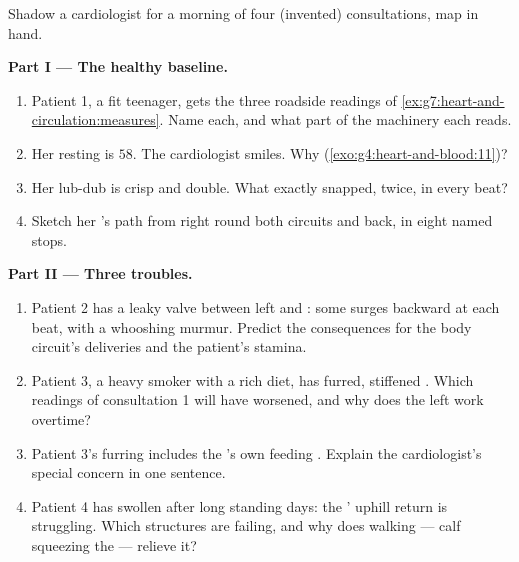 \begin{problem}\label{pb:g7:heart-and-circulation:1}
Shadow a cardiologist for a morning of four (invented)
consultations, map in hand.

\medskip\noindent\textbf{Part I --- The healthy
baseline.}
\begin{enumerate}
  \item Patient 1, a fit teenager, gets the three
        roadside readings of
        \cref{ex:g7:heart-and-circulation:measures}.
        Name each, and what part of the machinery each
        reads.
  \item Her resting  is $58$. The cardiologist
        smiles. Why
        (\cref{exo:g4:heart-and-blood:11})?
  \item Her lub-dub is crisp and double. What exactly
        snapped, twice, in every beat?
  \item Sketch her 's path from right  round
        both circuits and back, in eight named stops.
\end{enumerate}

\medskip\noindent\textbf{Part II --- Three troubles.}
\begin{enumerate}[resume]
  \item Patient 2 has a leaky valve between left 
        and : some  surges backward at
        each beat, with a whooshing murmur. Predict the
        consequences for the body circuit's deliveries
        and the patient's stamina.
  \item Patient 3, a heavy smoker with a rich diet, has
        furred, stiffened . Which readings of
        consultation 1 will have worsened, and why does
        the left  work overtime?
  \item Patient 3's furring includes the 's own
        feeding . Explain the cardiologist's
        special concern in one sentence.
  \item Patient 4 has swollen  after long
        standing days: the ' uphill return is
        struggling. Which structures are failing, and
        why does walking --- calf  squeezing the
         --- relieve it?
\end{enumerate}


\end{problem}
